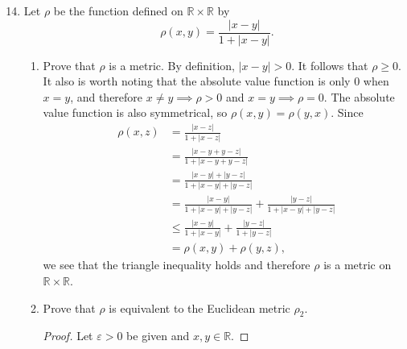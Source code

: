 \documentclass{article}
\begin{document}
\begin{enumerate}
            \setcounter{enumi}{13}
      \item Let $\rho$ be the function defined on $\mathbb{R}\times\mathbb{R}$
            by
            \[
                  \rho(x, y) = \frac{\lvert x-y\rvert}{1+\lvert x-y\rvert}.
            \]
            \begin{enumerate}
                  \item Prove that $\rho$ is a metric.
                        \medbreak
                        By definition, $\lvert x-y\rvert > 0$. It follows that $\rho\geq0$.
                        It also is worth noting that the absolute value function is only
                        $0$ when $x=y$, and therefore $x\neq y\implies \rho>0$ and
                        $x=y\implies\rho=0$. The absolute value function is also
                        symmetrical, so $\rho(x,y)=\rho(y,x)$. Since
                        \begin{align*}
                              \rho(x,z) & = \frac{\lvert x-z\rvert}{1+\lvert x-z\rvert}                                                                               \\
                                        & = \frac{\lvert x-y+y-z\rvert}{1+\lvert x-y+y-z\rvert}                                                                       \\
                                        & = \frac{\lvert x-y\rvert+\lvert y-z\rvert}{1+\lvert x-y\rvert+\lvert y-z\rvert}                                             \\
                                        & = \frac{\lvert x-y\rvert}{1+\lvert x-y\rvert+\lvert y-z\rvert}+\frac{\lvert y-z\rvert}{1+\lvert x-y\rvert+\lvert y-z\rvert} \\
                                        & \leq \frac{\lvert x-y\rvert}{1+\lvert x-y\rvert}+\frac{\lvert y-z\rvert}{1+\lvert y-z\rvert}                                \\
                                        & = \rho(x,y) + \rho(y,z),
                        \end{align*}
                        we see that the triangle inequality holds and therefore $\rho$
                        is a metric on $\mathbb{R}\times\mathbb{R}$.
                  \item Prove that $\rho$ is equivalent to the Euclidean
                        metric $\rho_2$.
                        \begin{proof}
                              Let $\varepsilon>0$ be given and $x, y\in\mathbb{R}$.

\end{proof}
\end{enumerate}
\end{enumerate}
\end{document}
